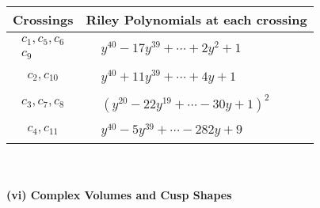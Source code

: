 \documentclass[1p]{elsarticle_modified}
\theoremstyle{definition}
\begin{document}
\begin{tabular}{m{50pt}|m{274pt}}
Crossings & \hspace{64pt}Riley Polynomials at each crossing \\
\hline $$\begin{aligned}c_{1},c_{5},c_{6}\\c_{9}\end{aligned}$$&$\begin{aligned}
&y^{40}-17 y^{39}+\cdots+2 y^2+1
\end{aligned}$\\
\hline $$\begin{aligned}c_{2},c_{10}\end{aligned}$$&$\begin{aligned}
&y^{40}+11 y^{39}+\cdots+4 y+1
\end{aligned}$\\
\hline $$\begin{aligned}c_{3},c_{7},c_{8}\end{aligned}$$&$\begin{aligned}
&(y^{20}-22 y^{19}+\cdots-30 y+1)^{2}
\end{aligned}$\\
\hline $$\begin{aligned}c_{4},c_{11}\end{aligned}$$&$\begin{aligned}
&y^{40}-5 y^{39}+\cdots-282 y+9
\end{aligned}$\\
\hline
\end{tabular}\\~\\
\newpage\flushleft \textbf{(vi) Complex Volumes and Cusp Shapes}
\end{document}
